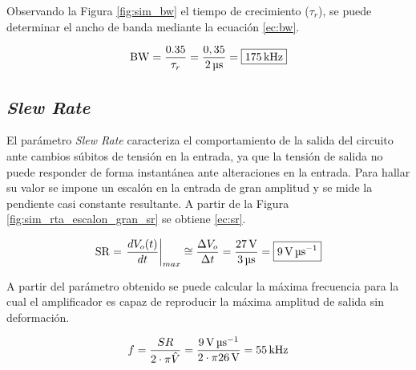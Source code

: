 
	Observando la Figura \ref{fig:sim_bw} el tiempo de crecimiento ($\tau_r$), se puede determinar el ancho de banda mediante la ecuación \eqref{ec:bw}.

	\begin{equation}
		\centering
		\mathrm{BW} = \frac{\num{0,35}}{\tau_r} = \frac{0,35}{\SI{2}{\micro\second}} = \boxed{\SI{175}{\kilo\hertz}}
		\label{ec:bw}
	\end{equation}

\subsection{\textit{Slew Rate}}


	
	El parámetro \textit{Slew Rate} caracteriza el comportamiento de la salida del circuito ante cambios súbitos de tensión en la entrada, ya que la tensión de salida no puede responder de forma instantánea ante alteraciones en la entrada. Para hallar su valor se impone un escalón en la entrada de gran amplitud y se mide la pendiente casi constante resultante. A partir de la Figura \ref{fig:sim_rta_escalon_gran_sr} se obtiene \eqref{ec:sr}.

	\begin{equation}
	\centering
	\mathrm{SR} = \left. \frac{dV_o(t)}{dt} \right\rvert_{max} \cong \frac{\Delta V_o}{\Delta t} = \frac{\SI{27}{\volt}}{\SI{3}{\micro\second}} = \boxed{\SI{9}{\volt\per\micro\second}}
	\label{ec:sr}
\end{equation}


A partir del parámetro obtenido se puede calcular la máxima frecuencia para la cual el amplificador es capaz de reproducir la máxima amplitud de salida sin deformación.

\begin{equation}
	\centering
	f = \frac{SR}{2 \cdot \pi \hat{V} } = \frac{\SI{9}{\volt\per\micro\second}}{2 \cdot \pi \SI{26}{\volt}} = \SI{55}{\kilo\hertz}
	\label{ec.max_f}
\end{equation}

